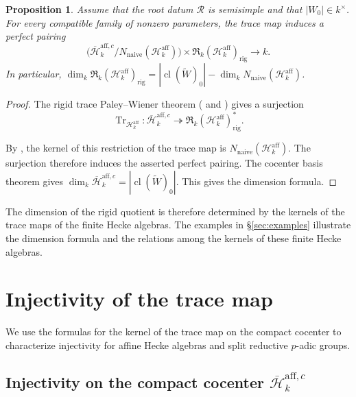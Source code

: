 \documentclass[11pt,letterpaper]{amsart}
\newtheorem{proposition}[theorem]{Proposition}
\theoremstyle{definition}
\numberwithin{equation}{section}
\numberwithin{theorem}{section}
\newcommand{\kk}{k}
\newcommand{\cH}{\mathcal H}
\newcommand{\bH}{\overline{\mathcal H}}
\newcommand{\cR}{\mathfrak R}
\newcommand{\Wt}{\tilde W}
\newcommand{\rig}{\mathrm{rig}}
\newcommand{\naive}{\mathrm{naive}}
\DeclareMathOperator{\Tr}{Tr}
\begin{document}
\begin{proposition}\label{cor:affine-character-extension}
Assume that the root datum $\mathscr R$ is semisimple
and that $|W_0|\in\kk^\times$. For every compatible family of nonzero parameters, the trace map induces a perfect pairing
\[
 \bigl(\bH_\kk^{\mathrm{aff},c}/
       N_{\naive}(\cH_\kk^{\mathrm{aff}})\bigr)
 \times
 \cR_\kk(\cH_\kk^{\mathrm{aff}})_{\rig}
 \longrightarrow\kk.
\]
In particular, $\dim_\kk\cR_\kk(\cH_\kk^{\mathrm{aff}})_{\rig}
 =
 |\operatorname{cl}(\Wt)_0|
 -
 \dim_\kk N_{\naive}(\cH_\kk^{\mathrm{aff}})$.
\end{proposition}

\begin{proof}
The rigid trace Paley--Wiener theorem (\cite[Theorem~1.1(3)]{CH} and \cite[\S3.7.1]{He16}) gives a surjection
\begin{equation*}
 \Tr_{\cH_\kk^{\mathrm{aff}}}:
 \bH_\kk^{\mathrm{aff},c}
 \twoheadrightarrow
 \cR_\kk(\cH_\kk^{\mathrm{aff}})_{\rig}^{*}.
\end{equation*}

By , the kernel of this restriction of the trace map is
$N_{\naive}(\cH_\kk^{\mathrm{aff}})$. The surjection therefore induces the asserted perfect pairing. The cocenter basis theorem
 gives
$\dim_\kk\bH_\kk^{\mathrm{aff},c}
 =
 |\operatorname{cl}(\Wt)_0|$. This gives the dimension formula.
\end{proof}

The dimension of the rigid quotient is therefore determined by the kernels of the trace maps of the finite Hecke algebras. The examples in \S\ref{sec:examples} illustrate the dimension formula and the relations among the kernels of these finite Hecke algebras. 


\par

\section{Injectivity of the trace map}


\label{sec:injectivity}

We use the formulas for the kernel of the trace map on the compact cocenter to characterize injectivity for affine Hecke algebras and split reductive $p$-adic groups. 

\subsection{Injectivity on the compact cocenter $\bH_\kk^{\mathrm{aff},c}$}
\label{subsec:injectivity-affine}
\end{document}
